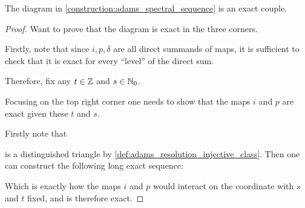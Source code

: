\begin{theorem}
    The diagram in \autoref{construction:adams_spectral_sequence} is an exact couple.
\end{theorem}
\begin{proof} %
    Want to prove that the diagram is exact in the three corners.

    Firstly, note that since \( i, p, \delta \) are all direct summands of maps, it is sufficient to check that it is exact for every ``level'' of the direct sum.

    Therefore, fix any \( t \in {\mathbb{Z}} \) and \( s \in {\mathbb{N}}_0 \).

    Focusing on the top right corner one needs to show that the maps \( i \) and \( p \) are exact given these \( t \) and \( s \).

    Firstly note that
    \begin{center}
    \end{center}
    is a distinguished triangle by \autoref{def:adams_resolution_injective_class}. Then one can construct the following long exact sequence:
    \begin{center}
    \end{center}

    Which is exactly how the maps \( i \) and \( p \) would interact on the coordinate with \( s \) and \( t \) fixed, and is therefore exact.


\end{proof}
